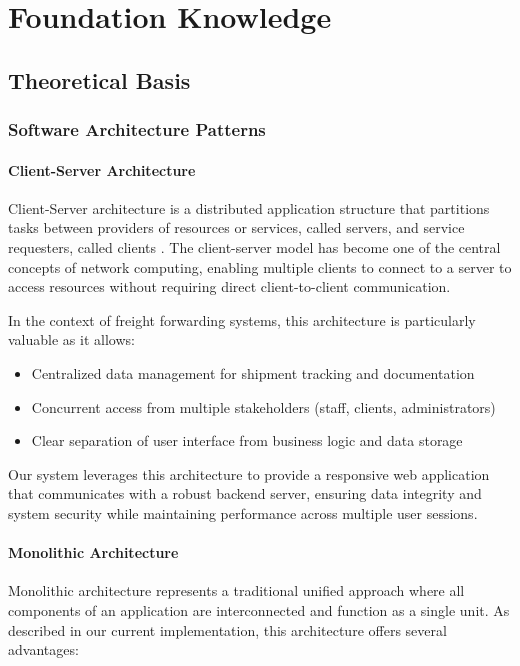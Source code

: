 \chapter{Foundation Knowledge}
\section{Theoretical Basis}
\subsection{Software Architecture Patterns}
\subsubsection{Client-Server Architecture}
Client-Server architecture is a distributed application structure that partitions tasks between providers of resources or services, called servers, and service requesters, called clients \cite{fielding2000rest}. The client-server model has become one of the central concepts of network computing, enabling multiple clients to connect to a server to access resources without requiring direct client-to-client communication.

In the context of freight forwarding systems, this architecture is particularly valuable as it allows:
\begin{itemize}
    \item Centralized data management for shipment tracking and documentation
    \item Concurrent access from multiple stakeholders (staff, clients, administrators)
    \item Clear separation of user interface from business logic and data storage
\end{itemize}

Our system leverages this architecture to provide a responsive web application that communicates with a robust backend server, ensuring data integrity and system security while maintaining performance across multiple user sessions.

\subsubsection{Monolithic Architecture}
Monolithic architecture \cite{harris_microservices_vs_monolith} represents a traditional unified approach where all components of an application are interconnected and function as a single unit. As described in our current implementation, this architecture offers several advantages:

